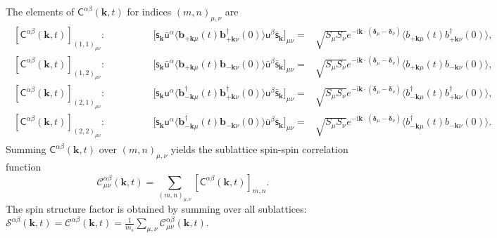 \documentclass[aps, prx, nofootinbib, superscriptaddress]{revtex4-2}
\newcommand{\kvec}{\mathbf{k}}
\newcommand{\ri}{\mathrm{i}}
\begin{document}
The elements of $\mathsf{C}^{\alpha\beta}(\kvec, t)$ for indices $(m,n)_{\mu,\nu}$ are
\begin{align*}
    \begin{array}{crl}
        {[\mathsf{C}^{\alpha\beta}(\kvec, t)]_{(1,1)_{\mu\nu}}} : \qquad\qquad
        &
        \big[
            \mathsf{s}_{\kvec} \bar{\mathsf{u}}^{\alpha} 
            \langle \mathbf{b}_{+\kvec\mu}           (t)    \mathbf{b}_{+\kvec\nu}^{\dagger} (0)    \rangle 
            \mathsf{u}^{\beta} \bar{\mathsf{s}}_{\kvec} 
        \big]_{\mu\nu}
        = &
        \sqrt{S_{\mu}S_{\nu}}e^{-\ri \kvec \cdot (\bm{\delta}_{\mu} - \bm{\delta}_{\nu})} 
        \big\langle b_{+\kvec\mu} (t) b_{+\kvec\nu}^{\dagger} (0) \big\rangle,
        \\
        {[\mathsf{C}^{\alpha\beta}(\kvec, t)]_{(1,2)_{\mu\nu}}} : \qquad\qquad
        &
        \big[
            \mathsf{s}_{\kvec} \bar{\mathsf{u}}^{\alpha} 
            \langle \mathbf{b}_{+\kvec\mu}           (t)    \mathbf{b}_{-\kvec\nu}           (0)    \rangle 
            \bar{\mathsf{u}}^{\beta} \bar{\mathsf{s}}_{\kvec}
        \big]_{\mu\nu}
        = & \sqrt{S_{\mu}S_{\nu}}e^{-\ri \kvec \cdot (\bm{\delta}_{\mu} - \bm{\delta}_{\nu})} 
        \big\langle b_{+\kvec\mu} (t) b_{-\kvec\nu} (0) \big\rangle,
        \\
        {[\mathsf{C}^{\alpha\beta}(\kvec, t)]_{(2,1)_{\mu\nu}}} : \qquad\qquad
        & 
        \big[
            \mathsf{s}_{\kvec} \mathsf{u}^{\alpha}
            \langle \mathbf{b}_{-\kvec\mu}^{\dagger} (t)    \mathbf{b}_{+\kvec\nu}^{\dagger} (0)    \rangle  
            \mathsf{u}^{\beta} \bar{\mathsf{s}}_{\kvec}  
        \big]_{\mu\nu}
        = & \sqrt{S_{\mu}S_{\nu}}e^{-\ri \kvec \cdot (\bm{\delta}_{\mu} - \bm{\delta}_{\nu})} 
        \big\langle b_{-\kvec\mu}^{\dagger} (t) b_{+\kvec\nu}^{\dagger} (0) \big\rangle,
        \\
        {[\mathsf{C}^{\alpha\beta}(\kvec, t)]_{(2,2)_{\mu\nu}}} : \qquad\qquad
        &
        \big[
            \mathsf{s}_{\kvec} \mathsf{u}^{\alpha}
            \langle \mathbf{b}_{-\kvec\mu}^{\dagger} (t)    \mathbf{b}_{-\kvec\nu}           (0)    \rangle
            \bar{\mathsf{u}}^{\beta} \bar{\mathsf{s}}_{\kvec}
        \big]_{\mu\nu}
        = & \sqrt{S_{\mu}S_{\nu}}e^{-\ri \kvec \cdot (\bm{\delta}_{\mu} - \bm{\delta}_{\nu})} 
        \big\langle b_{-\kvec\mu}^{\dagger} (t) b_{-\kvec\nu} (0) \big\rangle.
    \end{array}
\end{align*}
Summing $\mathsf{C}^{\alpha\beta}(\kvec, t)$ over $(m,n)_{\mu,\nu}$ yields the sublattice spin-spin correlation function
\begin{equation}
    \mathcal{C}_{\mu\nu}^{\alpha\beta} (\kvec, t) = \sum_{(m,n)_{\mu,\nu}} [\mathsf{C}^{\alpha\beta}(\kvec, t)]_{m,n}.
\end{equation}
The spin structure factor is obtained by summing over all sublattices: $\mathcal{S}^{\alpha\beta} (\kvec, t) = \mathcal{C}^{\alpha\beta} (\kvec, t) = \frac{1}{m_s} \sum_{\mu,\nu} \mathcal{C}_{\mu\nu}^{\alpha\beta} (\kvec, t)$.
\end{document}
